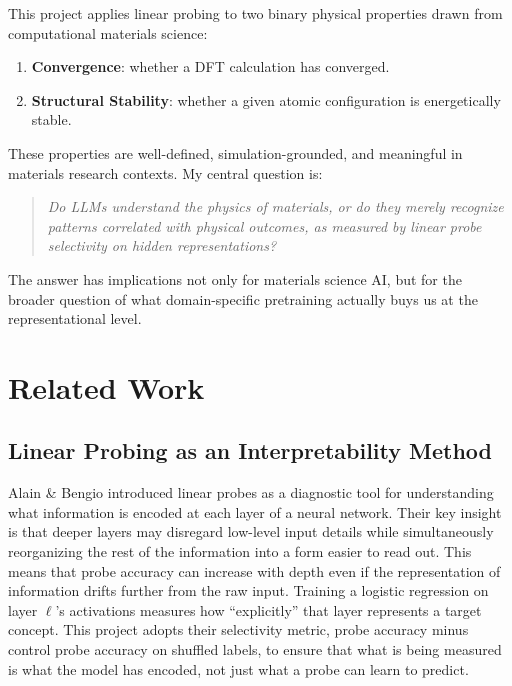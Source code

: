 \documentclass[11pt]{article}
\begin{document}
This project applies linear probing to two binary physical properties drawn from computational materials science:

\begin{enumerate}
    \item \textbf{Convergence}: whether a DFT calculation has converged.
    \item \textbf{Structural Stability}: whether a given atomic configuration is energetically stable.
\end{enumerate}

These properties are well-defined, simulation-grounded, and meaningful in materials research contexts. My central question is:

\begin{quote}
    \itshape Do LLMs understand the physics of materials, or do they merely recognize patterns correlated with physical outcomes, as measured by linear probe selectivity on hidden representations?
\end{quote}

The answer has implications not only for materials science AI, but for the broader question of what domain-specific pretraining actually buys us at the representational level.

\section{Related Work}

\subsection{Linear Probing as an Interpretability Method}

Alain \& Bengio \cite{alain2016} introduced linear probes as a diagnostic tool for understanding what information is encoded at each layer of a neural network. Their key insight is that deeper layers may disregard low-level input details while simultaneously reorganizing the rest of the information into a form easier to read out. This means that probe accuracy can increase with depth even if the representation of information drifts further from the raw input. Training a logistic regression on layer $\ell$'s activations measures how ``explicitly'' that layer represents a target concept. This project adopts their selectivity metric, probe accuracy minus control probe accuracy on shuffled labels, to ensure that what is being measured is what the model has encoded, not just what a probe can learn to predict.
\end{document}
